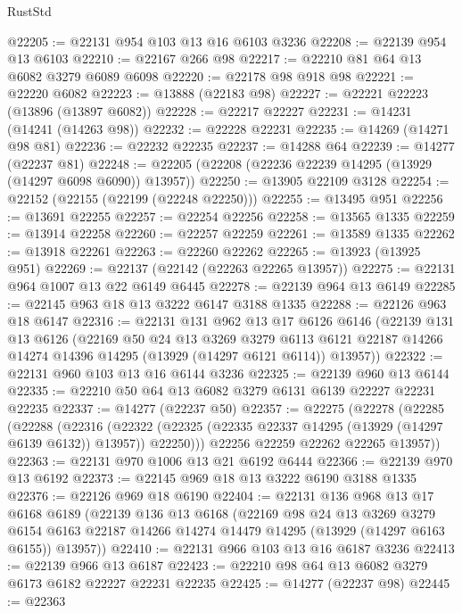 \begin{lexlean}{RustStd}
\begin{coremodule}
@22205 := @22131 @954 @103 @13 @16 @6103 @3236
@22208 := @22139 @954 @13 @6103
@22210 := @22167 @266 @98
@22217 := @22210 @81 @64 @13 @6082 @3279 @6089 @6098
@22220 := @22178 @98 @918 @98
@22221 := @22220 @6082
@22223 := @13888 (@22183 @98)
@22227 := @22221 @22223 (@13896 (@13897 @6082))
@22228 := @22217 @22227
@22231 := @14231 (@14241 (@14263 @98))
@22232 := @22228 @22231
@22235 := @14269 (@14271 @98 @81)
@22236 := @22232 @22235
@22237 := @14288 @64
@22239 := @14277 (@22237 @81)
@22248 := @22205 (@22208 (@22236 @22239 @14295 (@13929 (@14297 @6098 @6090)) @13957))
@22250 := @13905 @22109 @3128
@22254 := @22152 (@22155 (@22199 (@22248 @22250)))
@22255 := @13495 @951
@22256 := @13691 @22255
@22257 := @22254 @22256
@22258 := @13565 @1335
@22259 := @13914 @22258
@22260 := @22257 @22259
@22261 := @13589 @1335
@22262 := @13918 @22261
@22263 := @22260 @22262
@22265 := @13923 (@13925 @951)
@22269 := @22137 (@22142 (@22263 @22265 @13957))
@22275 := @22131 @964 @1007 @13 @22 @6149 @6445
@22278 := @22139 @964 @13 @6149
@22285 := @22145 @963 @18 @13 @3222 @6147 @3188 @1335
@22288 := @22126 @963 @18 @6147
@22316 := @22131
    @131
    @962
    @13
    @17
    @6126
    @6146
    (@22139
      @131
      @13
      @6126
      (@22169
        @50
        @24
        @13
        @3269
        @3279
        @6113
        @6121
        @22187
        @14266
        @14274
        @14396
        @14295
        (@13929 (@14297 @6121 @6114))
        @13957))
@22322 := @22131 @960 @103 @13 @16 @6144 @3236
@22325 := @22139 @960 @13 @6144
@22335 := @22210 @50 @64 @13 @6082 @3279 @6131 @6139 @22227 @22231 @22235
@22337 := @14277 (@22237 @50)
@22357 := @22275
    (@22278
      (@22285
        (@22288
          (@22316
            (@22322 (@22325 (@22335 @22337 @14295 (@13929 (@14297 @6139 @6132)) @13957)) @22250)))
        @22256
        @22259
        @22262
        @22265
        @13957))
@22363 := @22131 @970 @1006 @13 @21 @6192 @6444
@22366 := @22139 @970 @13 @6192
@22373 := @22145 @969 @18 @13 @3222 @6190 @3188 @1335
@22376 := @22126 @969 @18 @6190
@22404 := @22131
    @136
    @968
    @13
    @17
    @6168
    @6189
    (@22139
      @136
      @13
      @6168
      (@22169
        @98
        @24
        @13
        @3269
        @3279
        @6154
        @6163
        @22187
        @14266
        @14274
        @14479
        @14295
        (@13929 (@14297 @6163 @6155))
        @13957))
@22410 := @22131 @966 @103 @13 @16 @6187 @3236
@22413 := @22139 @966 @13 @6187
@22423 := @22210 @98 @64 @13 @6082 @3279 @6173 @6182 @22227 @22231 @22235
@22425 := @14277 (@22237 @98)
@22445 := @22363

\end{coremodule}
\end{lexlean}
